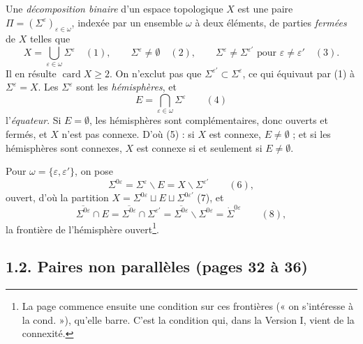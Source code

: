 \documentclass[11pt,a4paper]{article}
\begin{document}
Une \emph{décomposition binaire} d'un espace topologique $X$ est une paire
$\Pi = (\Sigma^{\varepsilon})_{\varepsilon \in \omega}$, indexée par un
ensemble $\omega$ à deux éléments, de parties \emph{fermées} de $X$ telles
que
\[
X = \bigcup_{\varepsilon \in \omega} \Sigma^{\varepsilon} \quad (1), \qquad
\Sigma^{\varepsilon} \neq \emptyset \quad (2), \qquad
\Sigma^{\varepsilon} \neq \Sigma^{\varepsilon'} \text{ pour } \varepsilon
\neq \varepsilon' \quad (3).
\]
Il en résulte $\operatorname{card} X \geqslant 2$. On n'exclut pas que
$\Sigma^{\varepsilon'} \subset \Sigma^{\varepsilon}$, ce qui équivaut par
(1) à $\Sigma^{\varepsilon} = X$. Les $\Sigma^{\varepsilon}$ sont les
\emph{hémisphères}, et
\[
E = \bigcap_{\varepsilon \in \omega} \Sigma^{\varepsilon} \qquad (4)
\]
l'\emph{équateur}. Si $E = \emptyset$, les hémisphères sont complémentaires,
donc ouverts et fermés, et $X$ n'est pas connexe. D'où (5) : si $X$ est
connexe, $E \neq \emptyset$ ; et si les hémisphères sont connexes, $X$ est
connexe si et seulement si $E \neq \emptyset$.

Pour $\omega = \{\varepsilon, \varepsilon'\}$, on pose
\[
\Sigma^{0\varepsilon} = \Sigma^{\varepsilon} \smallsetminus E = X
\smallsetminus \Sigma^{\varepsilon'} \qquad (6),
\]
ouvert, d'où la partition $X = \Sigma^{0\varepsilon} \sqcup E \sqcup
\Sigma^{0\varepsilon'}$ (7), et
\[
\overline{\Sigma^{0\varepsilon}} \cap E = \overline{\Sigma^{0\varepsilon}}
\cap \Sigma^{\varepsilon'} = \overline{\Sigma^{0\varepsilon}} \smallsetminus
\Sigma^{0\varepsilon} = \dot{\Sigma}^{0\varepsilon} \qquad (8),
\]
la frontière de l'hémisphère ouvert\footnote{La page commence ensuite une
condition sur ces frontières (« on s'intéresse à la cond. »), qu'elle barre.
C'est la condition qui, dans la Version I, vient de la connexité.}.

\subsection*{1.2. Paires non parallèles (pages 32 à 36)}
\end{document}
